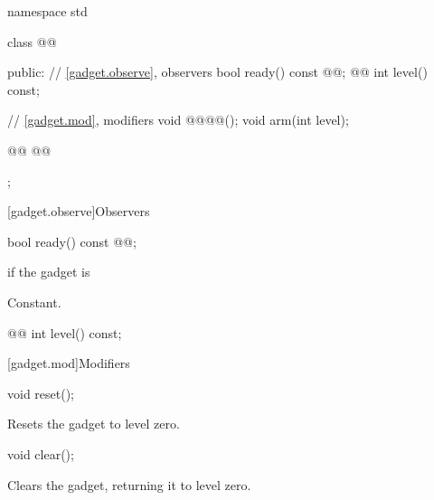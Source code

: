 \begin{codeblock}
namespace std {
  class @@ {
  public:
    // \ref{gadget.observe}, observers
    bool ready() const @@;
    @\added{[[nodiscard]]}@ int level() const;

    // \ref{gadget.mod}, modifiers
    void @@@@();
    void arm(int level);

    @@
    @@
  };
}
\end{codeblock}

[gadget.observe]{Observers}

%
\begin{itemdecl}
bool ready() const @@;
\end{itemdecl}

\begin{itemdescr}
\pnum
\returns
{} if the gadget is 

\begin{addedblock}
\pnum
\complexity
Constant.
\end{addedblock}
\end{itemdescr}

%
\begin{itemdecl}
@\added{[[nodiscard]]}@ int level() const;
\end{itemdecl}

\begin{itemdescr}
[\ldots]
\end{itemdescr}

[gadget.mod]{Modifiers}

\begin{removedblock}
%
\begin{itemdecl}
void reset();
\end{itemdecl}

\begin{itemdescr}
\pnum
\effects
Resets the gadget to level zero.
\end{itemdescr}
\end{removedblock}

\begin{addedblock}
%
\begin{itemdecl}
void clear();
\end{itemdecl}

\begin{itemdescr}
\pnum
\effects
Clears the gadget, returning it to level zero.
\end{itemdescr}
\end{addedblock}

